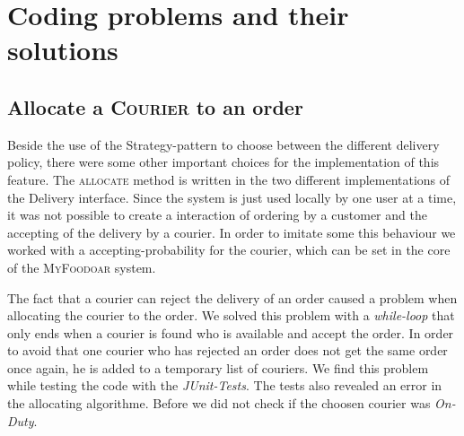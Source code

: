 \section{Coding problems and their solutions}
\label{sec:coding_problems_and_their_solutions}

\subsection{Allocate a \textsc{Courier} to an order}
\label{sub:allocate_a_courier_to_an_order}

Beside the use of the Strategy-pattern to choose between the different delivery policy, there were
some other important choices for the implementation of this feature. The \textsc{allocate} method 
is written in the two different implementations of the Delivery interface. Since the system is 
just used locally by one user at a time, it was not possible to create a interaction of ordering
by a customer and the accepting of the delivery by a courier. In order to imitate some this 
behaviour we worked with a accepting-probability for the courier, which can be set in the core of
the \textsc{MyFoodoar} system. 

The fact that a courier can reject the delivery of an order caused a problem when allocating the 
courier to the order. We solved this problem with a \textit{while-loop} that only ends when
a courier is found who is available and accept the order. In order to avoid that one courier who
has rejected an order does not get the same order once again, he is added to a temporary list of
couriers. We find this problem while testing the code with the \textit{JUnit-Tests}. The tests 
also revealed an error in the allocating algorithme. Before we did not check if the choosen 
courier was \textit{On-Duty}.

 

